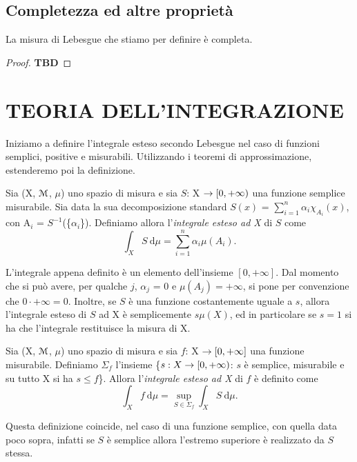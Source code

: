 \documentclass[Completo.tex]{subfiles}
\begin{document}
	\subsection{Completezza ed altre proprietà}
	\begin{Prop}
		La misura di Lebesgue che stiamo per definire è completa.
	\end{Prop}
	\begin{proof}
		\textbf{TBD}
	\end{proof}
	\section{TEORIA DELL'INTEGRAZIONE}
	Iniziamo a definire l'integrale esteso secondo Lebesgue nel caso di funzioni semplici, positive e misurabili. Utilizzando i teoremi di approssimazione, estenderemo poi la definizione.
	\begin{Def}
		Sia (X, $\eu[M]$, $\mu$) uno spazio di misura e sia $S$: X $\rightarrow [0, +\infty)$ una funzione semplice misurabile. Sia data la sua decomposizione standard $S(x)$ = $\sum_{i = 1}^{n} \alpha_i \chi_{A_i}(x)$, con A$_i$ = $S^{-1}$(\{$\alpha_i$\}). Definiamo allora l'\textit{integrale esteso ad X} di $S$ come
		\begin{equation*}
		\int_X S \ \mathrm{d}\mu = \sum\limits_{i=1}^{n} \alpha_i \mu(A_i).
		\end{equation*}
	\end{Def}
	\begin{Oss}
		L'integrale appena definito è un elemento dell'insieme $[0, +\infty]$. Dal momento che si può avere, per qualche $j$, $\alpha_j$ = 0 e $\mu(A_j) = +\infty$, si pone per convenzione che $0 \cdot +\infty = 0$. Inoltre, se $S$ è una funzione costantemente uguale a $s$, allora l'integrale esteso di $S$ ad X è semplicemente $s \mu(X)$, ed in particolare se $s = 1$ si ha che l'integrale restituisce la misura di X.
	\end{Oss}
	\begin{Def}
		Sia (X, $\eu[M]$, $\mu$) uno spazio di misura e sia $f$: X $\rightarrow [0, +\infty]$ una funzione  misurabile. Definiamo $\Sigma_f$ l'insieme \{$s: X \rightarrow [0, +\infty)$: $s$ è semplice, misurabile e su tutto X si ha $s \leq f$\}. Allora l'\textit{integrale esteso ad X} di $f$ è definito come
		\begin{equation*}
		\int_X f \ \mathrm{d}\mu = \sup\limits_{S \in \Sigma_f} \int_X S \ \mathrm{d}\mu.
		\end{equation*}
	\end{Def}
	\begin{Oss}
		Questa definizione coincide, nel caso di una funzione semplice, con quella data poco sopra, infatti se $S$ è semplice allora l'estremo superiore è realizzato da $S$ stessa.
	\end{Oss}
\end{document}
